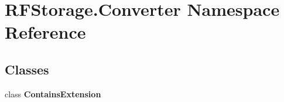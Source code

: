 \hypertarget{namespace_r_f_storage_1_1_converter}{}\section{R\+F\+Storage.\+Converter Namespace Reference}
\label{namespace_r_f_storage_1_1_converter}
\subsection*{Classes}
\begin{DoxyCompactItemize}
\item 
class {\bfseries Contains\+Extension}
\end{DoxyCompactItemize}
